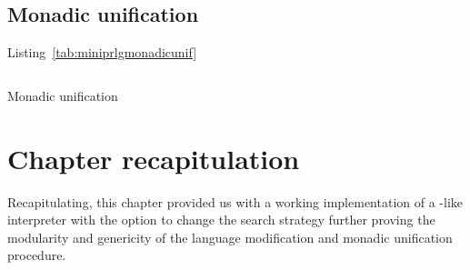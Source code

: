 \documentclass[thesis-solanki.tex]{files}
\begin{document}
\subsection{Monadic unification}
Listing~\ref{tab:miniprlgmonadicunif}
\begin{code-list}[H]
\begin{singlespace}
  \inputminted[linenos, firstline=1, lastline=41]{haskell}{haskell-proto3-bevy-icebox.hs}
\end{singlespace}
\caption{Monadic unification}
\label{tab:miniprlgmonadicunif}
\end{code-list}



\section{Chapter recapitulation}
Recapitulating, this chapter provided us with a working implementation of a -like interpreter with the option to change
the search strategy further proving the modularity and genericity of the language modification and monadic unification procedure.
\end{document}
